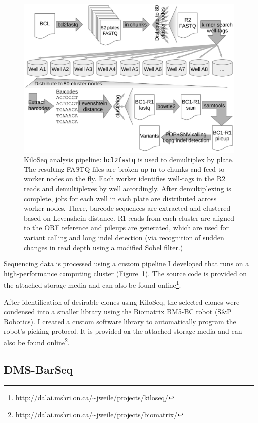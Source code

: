 \begin{figure}[h!]
	\centering
	\includegraphics[width=.6\textwidth]{img/kiloseq_pipeline.pdf}
	\caption{KiloSeq analysis pipeline: \texttt{bcl2fastq} is used to demultiplex by plate. The resulting FASTQ files are broken up in to chunks and feed to worker nodes on the fly. Each worker identifies well-tags in the R2 reads and demultiplexes by well accordingly. After demultiplexing is complete, jobs for each well in each plate are distributed across worker nodes. There, barcode sequences are extracted and clustered based on Levenshein distance. R1 reads from each cluster are aligned to the ORF reference and pileups are generated, which are used for variant calling and long indel detection (via recognition of sudden changes in read depth using a modified Sobel filter.)}
	\label{fig:kiloseqPipeline}
\end{figure}


Sequencing data is processed using a custom pipeline I developed that runs on a high-performance computing cluster (Figure~\ref{fig:kiloseqPipeline}). The source code is provided on the attached storage media and can also be found online\footnote{\url{http://dalai.mshri.on.ca/~jweile/projects/kiloseq/}}.

After identification of desirable clones using KiloSeq, the selected clones were condensed into a smaller library using the Biomatrix BM5-BC robot (S\&P Robotics). I created a custom software library to automatically program the robot's picking protocol. It is provided on the attached storage media and can also be found online\footnote{\url{http://dalai.mshri.on.ca/~jweile/projects/biomatrix/}}.

\subsection{DMS-BarSeq}

